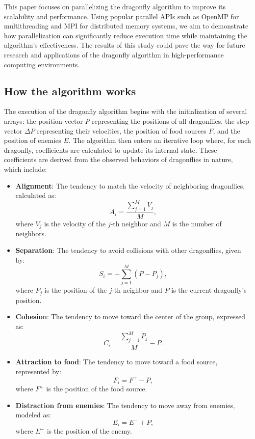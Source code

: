 \documentclass[10pt]{article}
\begin{document}
\begin{multicols}{2}
This paper focuses on parallelizing the dragonfly algorithm to improve its scalability and performance. Using popular parallel APIs such as OpenMP for multithreading and MPI for distributed memory systems, we aim to demonstrate how parallelization can significantly reduce execution time while maintaining the algorithm's effectiveness. The results of this study could pave the way for future research and applications of the dragonfly algorithm in high-performance computing environments.

\subsection*{How the algorithm works}
The execution of the dragonfly algorithm begins with the initialization of several arrays: the position vector $P$ representing the positions of all dragonflies, the step vector $\Delta P$ representing their velocities, the position of food sources $F$, and the position of enemies $E$. The algorithm then enters an iterative loop where, for each dragonfly, coefficients are calculated to update its internal state. These coefficients are derived from the observed behaviors of dragonflies in nature, which include:

\begin{itemize}
  \item \textbf{Alignment}: The tendency to match the velocity of neighboring dragonflies, calculated as:
  $$A_i = \frac{\sum_{j=1}^M V_j}{M},$$
  where $V_j$ is the velocity of the $j$-th neighbor and $M$ is the number of neighbors.

  \item \textbf{Separation}: The tendency to avoid collisions with other dragonflies, given by:
  $$S_i = -\sum_{j=1}^M (P - P_j),$$
  where $P_j$ is the position of the $j$-th neighbor and $P$ is the current dragonfly's position.

  \item \textbf{Cohesion}: The tendency to move toward the center of the group, expressed as:
  $$C_i = \frac{\sum_{j=1}^M P_j}{M} - P.$$

  \item \textbf{Attraction to food}: The tendency to move toward a food source, represented by:
  $$F_i = F^+ - P,$$
  where $F^+$ is the position of the food source.

  \item \textbf{Distraction from enemies}: The tendency to move away from enemies, modeled as:
  $$E_i = E^- + P,$$
  where $E^-$ is the position of the enemy.
\end{itemize}


\end{multicols}
\end{document}
